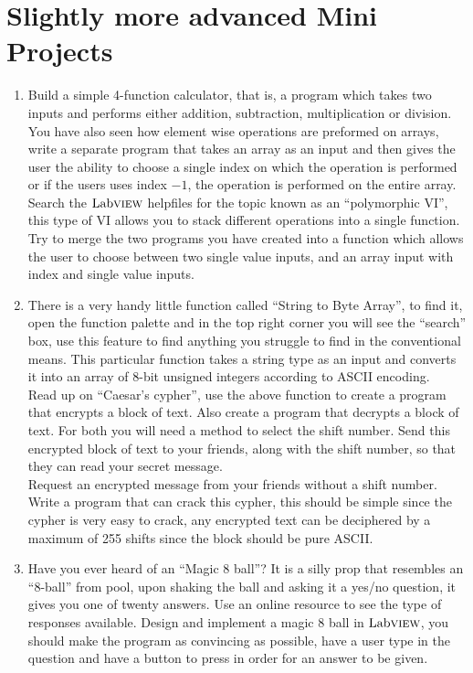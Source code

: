 \section{Slightly more advanced Mini Projects}
\begin{enumerate}
	\item Build a simple 4-function calculator, that is, a program which takes two inputs and performs either addition, subtraction, multiplication or division.\\
	
	You have also seen how element wise operations are preformed on arrays, write a separate program that takes an array as an input and then gives the user the ability to choose a single index on which the operation is performed or if the users uses index $-1$, the operation is performed on the entire array.\\
	
	Search the $\text{Lab}\textsc{view}$ helpfiles for the topic known as an ``polymorphic VI'', this type of VI allows you to stack different operations into a single function. Try to merge the two programs you have created into a function which allows the user to choose between two single value inputs, and an array input with index and single value inputs.
	
	\item There is a very handy little function called ``String to Byte Array'', to find it, open the function palette and in the top right corner you will see the ``search'' box, use this feature to find anything you struggle to find in the conventional means. This particular function takes a string type as an input and converts it into an array of 8-bit unsigned integers according to ASCII encoding.\\
	
	Read up on ``Caesar's cypher'', use the above function to create a program that encrypts a block of text. Also create a program that decrypts a block of text. For both you will need a method to select the shift number. Send this encrypted block of text to your friends, along with the shift number, so that they can read your secret message.\\
	
	Request an encrypted message from your friends without a shift number. Write a program that can crack this cypher, this should be simple since the cypher is very easy to crack, any encrypted text can be deciphered by a maximum of 255 shifts since the block should be pure ASCII.
	
	\item Have you ever heard of an ``Magic 8 ball''? It is a silly prop that resembles an ``8-ball'' from pool, upon shaking the ball and asking it a yes/no question, it gives you one of twenty answers. Use an online resource to see the type of responses available. Design and implement a magic 8 ball in $\text{Lab}\textsc{view}$, you should make the program as convincing as possible, have a user type in the question and have a button to press in order for an answer to be given.\\
	

\end{enumerate}
